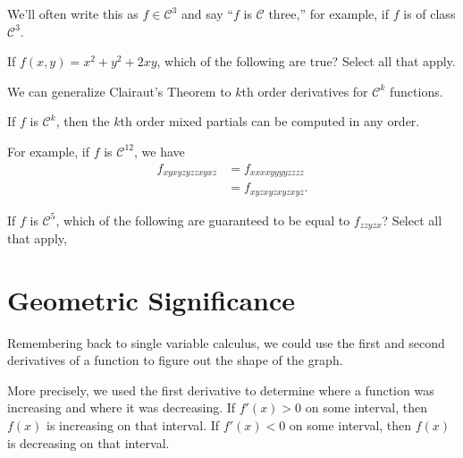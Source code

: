 \documentclass{ximera}
\begin{document}
We'll often write this as $f\in\mathcal{C}^3$ and say ``$f$ is $\mathcal{C}$ three,'' for example, if $f$ is of class $\mathcal{C}^3$.

\begin{problem}
If $f(x,y) = x^2+y^2+2xy$, which of the following are true? Select all that apply.
\begin{selectAll}
\end{selectAll}
\end{problem}

We can generalize Clairaut's Theorem to $k$th order derivatives for $\mathcal{C}^k$ functions.

\begin{theorem}
If $f$ is $\mathcal{C}^k$, then the $k$th order mixed partials can be computed in any order.
\end{theorem}

For example, if $f$ is $\mathcal{C}^{12}$, we have
\begin{align*}
f_{xyxyzyzzxyxz}&=f_{xxxxyyyyzzzz}\\
&=f_{xyzxyzxyzxyz}.
\end{align*}

\begin{problem}
If $f$ is $\mathcal{C}^5$, which of the following are guaranteed to be equal to $f_{zzyzx}$? Select all that apply,
\begin{selectAll}
\end{selectAll}
\end{problem}

\section*{Geometric Significance}

Remembering back to single variable calculus, we could use the first and second derivatives of a function to figure out the shape of the graph.

More precisely, we used the first derivative to determine where a function was increasing and where it was decreasing. If $f'(x)>0$ on some interval, then $f(x)$ is increasing on that interval. If $f'(x)<0$ on some interval, then $f(x)$ is decreasing on that interval.
\end{document}
